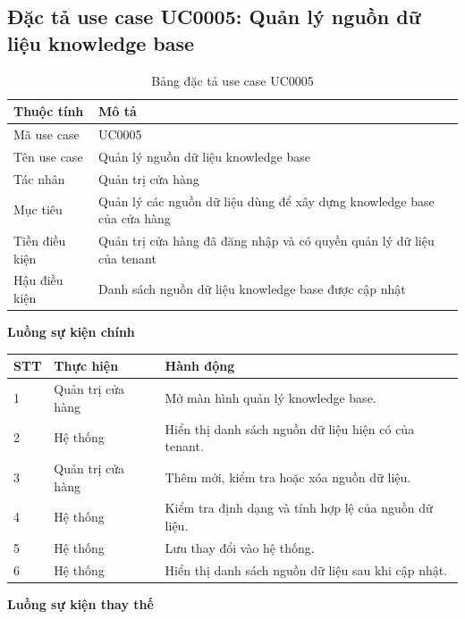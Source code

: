 \documentclass[../DoAn.tex]{subfiles}
\begin{document}
\subsection{Đặc tả use case UC0005: Quản lý nguồn dữ liệu knowledge base}
\label{subsection:2.3.2}

\begin{table}[H]
\centering
\caption{Bảng đặc tả use case UC0005}
\label{table:uc0005}
\begin{tabular}{|p{}|p{}|}
\hline
\textbf{Thuộc tính} & \textbf{Mô tả} \\
\hline
Mã use case & UC0005 \\
\hline
Tên use case & Quản lý nguồn dữ liệu knowledge base \\
\hline
Tác nhân & Quản trị cửa hàng \\
\hline
Mục tiêu & Quản lý các nguồn dữ liệu dùng để xây dựng knowledge base của cửa hàng \\
\hline
Tiền điều kiện & Quản trị cửa hàng đã đăng nhập và có quyền quản lý dữ liệu của tenant \\
\hline
Hậu điều kiện & Danh sách nguồn dữ liệu knowledge base được cập nhật \\
\hline
\end{tabular}
\end{table}

\textbf{Luồng sự kiện chính}

\begin{table}[H]
\centering
\begin{tabular}{|p{}|p{}|p{}|}
\hline
\textbf{STT} & \textbf{Thực hiện} & \textbf{Hành động} \\
\hline
1 & Quản trị cửa hàng & Mở màn hình quản lý knowledge base. \\
\hline
2 & Hệ thống & Hiển thị danh sách nguồn dữ liệu hiện có của tenant. \\
\hline
3 & Quản trị cửa hàng & Thêm mới, kiểm tra hoặc xóa nguồn dữ liệu. \\
\hline
4 & Hệ thống & Kiểm tra định dạng và tính hợp lệ của nguồn dữ liệu. \\
\hline
5 & Hệ thống & Lưu thay đổi vào hệ thống. \\
\hline
6 & Hệ thống & Hiển thị danh sách nguồn dữ liệu sau khi cập nhật. \\
\hline
\end{tabular}
\end{table}

\textbf{Luồng sự kiện thay thế}
\end{document}
